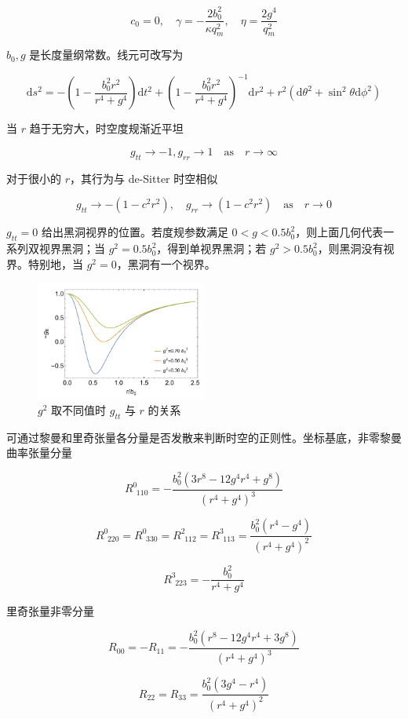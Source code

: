 \documentclass[aps,prl,preprint,groupedaddress,showkeys]{revtex4-2}
\begin{document}
$$
c_0=0,\quad
\gamma=-\frac{2b_0^2 }{\kappa q_m^2} ,\quad
\eta=\frac{2g^4 }{q_m^2 }
$$

$b_0,g $ 是长度量纲常数。线元可改写为

$$
\mathrm{d}s^2
=-\left(1-\frac{b_0^2r^2 }{r^4+g^4 }  \right)\mathrm{d}t^2 + \left(1-\frac{b_0^2r^2 }{r^4+g^4 }  \right)^{-1}\mathrm{d}r^2 + r^2\left(\mathrm{d}\theta^2+\sin^2\theta \mathrm{d}\phi^2 \right)
$$

当 $r$ 趋于无穷大，时空度规渐近平坦

$$
g_{tt}\to -1,g_{rr}\to 1 \quad \mathrm{as}\quad r\to\infty
$$

对于很小的 $r$，其行为与 de-Sitter 时空相似

$$
g_{tt}\to -\left(1-c^2r^2 \right),\quad g_{rr} \to \left(1-c^2r^2 \right)\quad \mathrm{as}\quad r\to 0
$$

$g_{tt}=0$ 给出黑洞视界的位置。若度规参数满足 $0<g<0.5 b_0^2 $，则上面几何代表一系列双视界黑洞；当 $g^2=0.5b_0^2$，得到单视界黑洞；若 $g^2>0.5b_0^2$，则黑洞没有视界。特别地，当 $g^2=0$，黑洞有一个视界。

\begin{figure}[htbp]
    \centering
    \includegraphics[width=0.5\textwidth]{fig/fig4.png}
    \caption{$g^2$ 取不同值时 $g_{tt}$ 与 $r$ 的关系}
\end{figure}  

可通过黎曼和里奇张量各分量是否发散来判断时空的正则性。坐标基底，非零黎曼曲率张量分量

$$
R^0_{~~ 110} 
=-\frac{b_0^2\left(3r^8 - 12 g^4 r^4 + g^8 \right) }{\left(r^4+g^4 \right)^3 } 
$$

$$
R^0_{~~220} = R^0_{~~330} = R^2_{~~112} = R^3_{~~113}
=\frac{b_0^2\left(r^4-g^4 \right) }{\left(r^4+g^4 \right)^2 }
$$

$$
R^3_{~~223}
=-\frac{b_0^2 }{r^4+g^4 } 
$$

里奇张量非零分量

$$
R_{00} = -R_{11} = -\frac{b_0^2\left(r^8-12g^4r^4+3g^8 \right) }{\left(r^4+g^4 \right)^3 } 
$$

$$
R_{22} = R_{33} = \frac{b_0^2 \left(3g^4-r^4 \right) }{\left(r^4+g^4 \right)^2 }
$$
\end{document}
